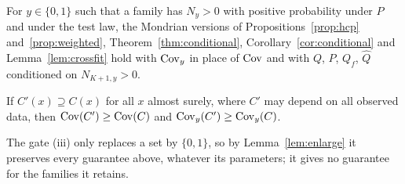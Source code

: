 \begin{proposition}\label{prop:mondrian}
For $y\in\{0,1\}$ such that a family has $N_{y}>0$ with positive probability under $P$ and under the test law, the Mondrian versions of Propositions~\ref{prop:hcp} and~\ref{prop:weighted}, Theorem~\ref{thm:conditional}, Corollary~\ref{cor:conditional} and Lemma~\ref{lem:crossfit} hold with $\mathrm{Cov}_y$ in place of $\mathrm{Cov}$ and with $Q$, $P$, $Q_f$, $\hat Q$ conditioned on $N_{K+1,y}>0$.
\end{proposition}

\begin{lemma}[Enlargement]\label{lem:enlarge}
If $C'(x)\supseteq C(x)$ for all $x$ almost surely, where $C'$ may depend on all observed data, then $\mathrm{Cov}(C')\ge\mathrm{Cov}(C)$ and $\mathrm{Cov}_y(C')\ge\mathrm{Cov}_y(C)$.
\end{lemma}
The gate (iii) only replaces a set by $\{0,1\}$, so by Lemma~\ref{lem:enlarge} it preserves every guarantee above, whatever its parameters; it gives no guarantee for the families it retains.

